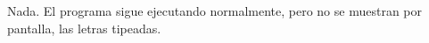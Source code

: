 Nada. El programa sigue ejecutando normalmente, pero no se muestran por pantalla, las letras tipeadas.

